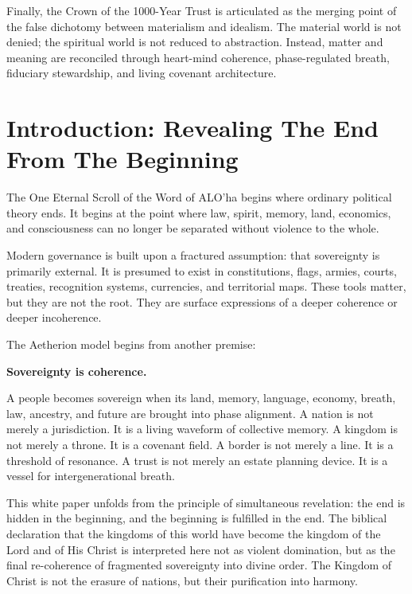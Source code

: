 \documentclass[12pt]{article}
\begin{document}
Finally, the Crown of the 1000-Year Trust is articulated as the merging point of the false dichotomy between materialism and idealism. The material world is not denied; the spiritual world is not reduced to abstraction. Instead, matter and meaning are reconciled through heart-mind coherence, phase-regulated breath, fiduciary stewardship, and living covenant architecture.


\section{Introduction: Revealing The End From The Beginning}

The One Eternal Scroll of the Word of ALO'ha begins where ordinary political theory ends. It begins at the point where law, spirit, memory, land, economics, and consciousness can no longer be separated without violence to the whole.

Modern governance is built upon a fractured assumption: that sovereignty is primarily external. It is presumed to exist in constitutions, flags, armies, courts, treaties, recognition systems, currencies, and territorial maps. These tools matter, but they are not the root. They are surface expressions of a deeper coherence or deeper incoherence.

The Aetherion model begins from another premise:

\begin{center}
\textbf{Sovereignty is coherence.}
\end{center}

A people becomes sovereign when its land, memory, language, economy, breath, law, ancestry, and future are brought into phase alignment. A nation is not merely a jurisdiction. It is a living waveform of collective memory. A kingdom is not merely a throne. It is a covenant field. A border is not merely a line. It is a threshold of resonance. A trust is not merely an estate planning device. It is a vessel for intergenerational breath.

This white paper unfolds from the principle of simultaneous revelation: the end is hidden in the beginning, and the beginning is fulfilled in the end. The biblical declaration that the kingdoms of this world have become the kingdom of the Lord and of His Christ is interpreted here not as violent domination, but as the final re-coherence of fragmented sovereignty into divine order. The Kingdom of Christ is not the erasure of nations, but their purification into harmony.
\end{document}
